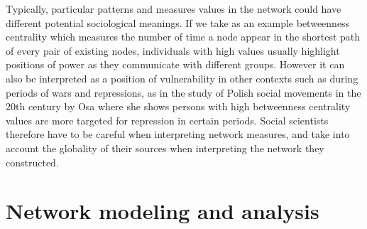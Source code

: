 Typically, particular patterns and measures values in the network could have different potential sociological meanings.
If we take as an example betweenness centrality which measures the number of time a node appear in the shortest path of every pair of existing nodes, individuals with high values usually highlight positions of power as they communicate with different groups.
However it can also be interpreted as a position of vulnerability in other contexts such as during periods of wars and repressions, as in the study of Polish social movements in the 20th century by Osa \cite{osaSolidarityContentionNetworks2003} where she shows persons with high betweenness centrality values are more targeted for repression in certain periods.
Social scientists therefore have to be careful when interpreting network measures, and take into account the globality of their sources when interpreting the network they constructed.


\section{Network modeling and analysis}\label{sec:modeling}



